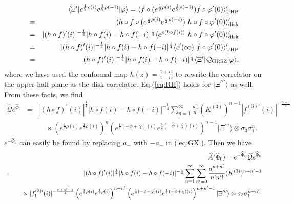 \documentclass[a4paper,12pt]{article}
\newcommand{\cQ}{\mathcal{Q}}
\newcommand{\Qmid}{\cQ_{\mathrm{GRSZ}}}
\newcommand{\tp}{\prime\prime\prime}
\begin{document}
\begin{eqnarray*}
& &\hspace{-1.5cm}\langle\Xi^{\prime}|e^{\frac{1}{2}\rho(i)}e^{\frac{1}{2}\rho(-i)}|\varphi\rangle=
\langle f\circ (e^{\frac{1}{2}\rho(i)}e^{\frac{1}{2}\rho(-i)})f\circ\varphi^{\prime}(0)
\rangle^{\prime}_{\mathrm{UHP}} \\ &=&\langle h\circ f\circ(e^{\frac{1}{2}\rho(i)}e^{\frac{1}{2}\rho(-i)})\ 
h\circ f\circ \varphi^{\prime}(0)\rangle^{\prime}_{\mathrm{disk}} \\
&=&|(h\circ f)^{\prime}(i)|^{-\frac{1}{4}}|h\circ f(i)-h\circ f(-i)|^{\frac{1}{4}}\langle e^{\rho
(h\circ f(i))}\ h\circ f\circ\varphi^{\prime}(0)\rangle^{\prime}_{\mathrm{disk}} \\
&=&|(h\circ f)^{\prime}(i)|^{-\frac{1}{4}}|h\circ f(i)-h\circ f(-i)|^{\frac{1}{4}}\langle c^{\prime}(\infty)
\ f\circ\varphi^{\prime}(0)\rangle^{\prime}_{\mathrm{UHP}} \\
&=&|(h\circ f)^{\prime}(i)|^{-\frac{1}{4}}|h\circ f(i)-h\circ f(-i)|^{\frac{1}{4}}\langle\Xi^{\prime}|
\Qmid|\varphi\rangle, 
\end{eqnarray*}
where we have used the conformal map $h(z)=\frac{1+iz}{1-iz}$ to rewrite the correlator on the upper half plane 
as the disk correlator. 
Eq.(\ref{eq:RH}) holds for $|\Xi^{\tp}\rangle$ as well. From these facts, we find 
\begin{eqnarray}
\widehat{\cQ}e^{\widehat{\Phi}_0}&=&
|(h\circ f)^{\prime}(i)|^{\frac{1}{4}}|h\circ f(i)-h\circ f(-i)|^{-\frac{1}{4}}
\sum_{n=1}^{\infty}\frac{a_-^n}{n!} (K^{(3)})^{n-1} |
f^{(3)\prime}_1(i)|^{-\frac{n-1}{4}}\nonumber \\ & &{}\quad\times\left( e^{\frac{1}{2}\rho(i)}
e^{\frac{1}{2}\bar{\rho}(i)}\right)^n  
\left(e^{\frac{1}{2}(-\phi+\chi)(i)}e^{\frac{1}{2}(
-\bar{\phi}+\bar{\chi})(i)}\right)^{n-1}|\Xi^{\tp}\rangle\otimes\sigma_3\sigma_1^n. \label{eq:GY}
\end{eqnarray}
$e^{-\widehat{\Phi}_0}$ can easily be found by replacing $a_{-}$ with $-a_{-}$ in (\ref{eq:GX}). Then we have 
\begin{eqnarray}
& &\hspace{-1cm}\widehat{A}(\widehat{\Phi}_0)=e^{-\widehat{\Phi}_0}\widehat{\cQ}e^{\widehat{\Phi}_0} \nonumber \\
&=&|(h\circ f)^{\prime}(i)|^{\frac{1}{4}}|h\circ f(i)-h\circ f(-i)|^{-\frac{1}{4}}
\sum_{n=1}^{\infty}\sum_{n^{\prime}=0}^{\infty}\frac{a_-^{n+n^{\prime}}}{n!n^{\prime}!}
(K^{(3)})^{n+n^{\prime}-1} \label{eq:HA} \\
& &\ \ {}\times |f^{(3)\prime}_1(i)|^{-\frac{n+n^{\prime}-1}{4}} 
\left( e^{\frac{1}{2}\rho(i)}e^{\frac{1}{2}\bar{\rho}(i)}\right)^{n+n^{\prime}}
\left(e^{\frac{1}{2}(-\phi+\chi)(i)}e^{\frac{1}{2}(-\bar{\phi}+\bar{\chi})(i)}
\right)^{n+n^{\prime}-1}|\Xi^{\tp}\rangle\otimes\sigma_3\sigma_1^{n+n^{\prime}}. 
\nonumber
\end{eqnarray}
\end{document}
